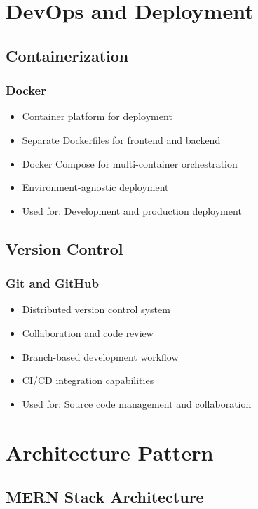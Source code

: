 \documentclass[12pt,a4paper]{report}
\begin{document}
\section{DevOps and Deployment}

\subsection{Containerization}

\subsubsection{Docker}
\begin{itemize}[leftmargin=*]
    \item Container platform for deployment
    \item Separate Dockerfiles for frontend and backend
    \item Docker Compose for multi-container orchestration
    \item Environment-agnostic deployment
    \item Used for: Development and production deployment
\end{itemize}

\subsection{Version Control}

\subsubsection{Git and GitHub}
\begin{itemize}[leftmargin=*]
    \item Distributed version control system
    \item Collaboration and code review
    \item Branch-based development workflow
    \item CI/CD integration capabilities
    \item Used for: Source code management and collaboration
\end{itemize}

\section{Architecture Pattern}

\subsection{MERN Stack Architecture}
\end{document}
